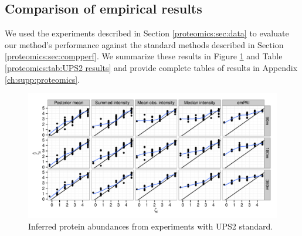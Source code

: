 
\subsection{Comparison of empirical results}
\label{proteomics:sec:dataanalysis}

We used the experiments described in Section \ref{proteomics:sec:data} to evaluate our method's performance against the standard methods described in Section \ref{proteomics:sec:compperf}.
We summarize these results in Figure \ref{proteomics:fig:UPS2 results} and Table \ref{proteomics:tab:UPS2 results} and provide complete tables of results in Appendix \ref{ch:supp:proteomics}.
%
\ifx\nofigures\undefined
\begin{figure}
\centering
\includegraphics[width=\textwidth]{figures/proteomics/figures_draft_ups2}
\caption{Inferred protein abundances from experiments with UPS2 standard.
\label{proteomics:fig:UPS2 results}}
\end{figure}
\fi
%
\ifx\nofigures\undefined
